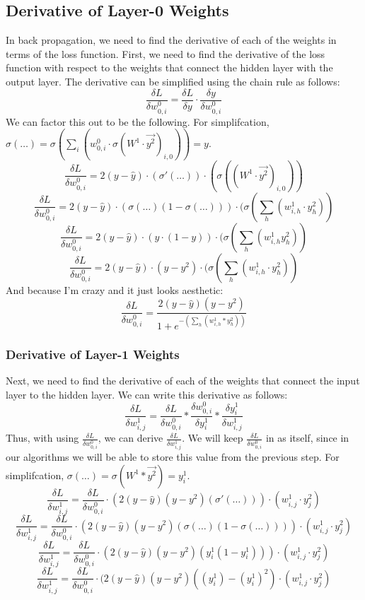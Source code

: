 \documentclass[10pt]{article}
\begin{document}
\subsection{Derivative of Layer-0 Weights}
In back propagation, we need to find the derivative of each of the weights in terms of the loss function. First, we need to find the derivative of the loss function with respect to the weights that connect the hidden layer with the output layer. The derivative can be simplified using the chain rule as follows:
$$\frac{\delta L}{\delta w^0_{0,i}} = \frac{\delta L}{\delta y} \cdot \frac{\delta y}{\delta w^0_{0,i}}$$
We can factor this out to be the following. 
\newline
For simplifcation, $\sigma(\ldots) = \sigma(\sum_i{(w^0_{0,i} \cdot \sigma(W^1 \cdot \vec{y^2})_{i,0})}) = y$.
$$\frac{\delta L}{\delta w^0_{0,i}} = 2(y - \hat{y}) \cdot (\sigma'(\ldots)) \cdot (\sigma((W^1 \cdot \vec{y^2})_{i,0}))$$
$$\frac{\delta L}{\delta w^0_{0,i}} = 2(y - \hat{y}) \cdot (\sigma(\ldots)(1 - \sigma(\ldots))) \cdot (\sigma(\sum_h{(w^1_{i,h} \cdot y^2_{h})})$$
$$\frac{\delta L}{\delta w^0_{0,i}} = 2(y - \hat{y}) \cdot (y \cdot (1 - y)) \cdot (\sigma(\sum_h{(w^1_{i,h} y^2_{h})})$$
$$\frac{\delta L}{\delta w^0_{0,i}} = 2(y - \hat{y}) \cdot (y - y^2) \cdot  (\sigma(\sum_h^{}{(w^1_{i,h} \cdot y^2_{h})})$$
And because I'm crazy and it just looks aesthetic:
$$\frac{\delta L}{\delta w^0_{0,i}} = \frac{2(y - \hat{y})(y - y^2)}{1 + e^{-(\sum_h^{}{(w^1_{i,h} *y^2_{h})})}}$$


\subsubsection{Derivative of Layer-1 Weights}
Next, we need to find the derivative of each of the weights that connect the input layer to the hidden layer. We can write this derivative as follows:
$$\frac{\delta L}{\delta w^1_{i,j}} = \frac{\delta L}{\delta w^0_{0,i}} * \frac{\delta w^0_{0,i}}{\delta y^1_i} * \frac{\delta y^1_i}{\delta w^1_{i,j}}$$
Thus, with using $\frac{\delta L}{\delta w^0_{0,i}}$, we can derive $\frac{\delta L}{\delta w^1_{i,j}}$. We will keep $\frac{\delta L}{\delta w^0_{0,i}}$ in as itself, since in our algorithms we will be able to store this value from the previous step.
\newline
For simplifcation, $\sigma(\ldots) = \sigma(W^1 * \vec{y^2}) = y^1_i$.
$$\frac{\delta L}{\delta w^1_{i,j}} = \frac{\delta L}{\delta w^0_{0,i}} \cdot (2(y-\hat{y})(y - y^2)(\sigma'(\ldots))) \cdot (w^1_{i,j} \cdot y^2_{j})$$
$$\frac{\delta L}{\delta w^1_{i,j}} = \frac{\delta L}{\delta w^0_{0,i} } \cdot (2(y - \hat{y})(y - y^2)(\sigma(\ldots)(1 - \sigma(\ldots)))) \cdot (w^1_{i,j} \cdot y^2_{j})$$
$$\frac{\delta L}{\delta w^1_{i,j}} = \frac{\delta L}{\delta w^0_{0,i}} \cdot (2(y - \hat{y})(y - y^2)(y^1_i (1 - y^1_i))) \cdot (w^1_{i,j} \cdot y^2_{j})$$
$$\frac{\delta L}{\delta w^1_{i,j}} = \frac{\delta L}{\delta w^0_{0,i}} \cdot (2(y - \hat{y})(y - y^2)((y^1_i) - (y^1_i)^2) \cdot (w^1_{i,j} \cdot y^2_{j})$$
\end{document}
